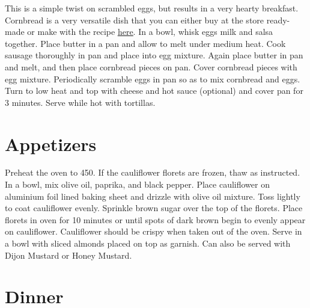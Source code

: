 \documentclass[oneside]{recipe}
\begin{document}
This is a simple twist on scrambled eggs, but results in a very hearty breakfast. Cornbread is a very versatile dish that you can either buy at the store ready-made or make with the recipe \href{}{\underline{here}}. In a bowl, whisk eggs milk and salsa together. Place butter in a pan and allow to melt under medium heat. Cook sausage thoroughly in pan and place into egg mixture. Again place butter in pan and melt, and then place cornbread pieces on pan. Cover cornbread pieces with egg mixture. Periodically scramble eggs in pan so as to mix cornbread and eggs. Turn to low heat and top with cheese and hot sauce (optional) and cover pan for 3 minutes. Serve while hot with tortillas. 




\chapter{Appetizers}
Preheat the oven to 450. If the cauliflower florets are frozen, thaw as instructed. In a bowl, mix olive oil, paprika, and black pepper. Place cauliflower on aluminium foil lined baking sheet and drizzle with olive oil mixture. Toss lightly to coat cauliflower evenly. Sprinkle brown sugar over the top of the florets. Place florets in oven for 10 minutes or until spots of dark brown begin to evenly appear on cauliflower. Cauliflower should be crispy when taken out of the oven. Serve in a bowl with sliced almonds placed on top as garnish. Can also be served with Dijon Mustard or Honey Mustard.

\chapter{Dinner}
\end{document}
